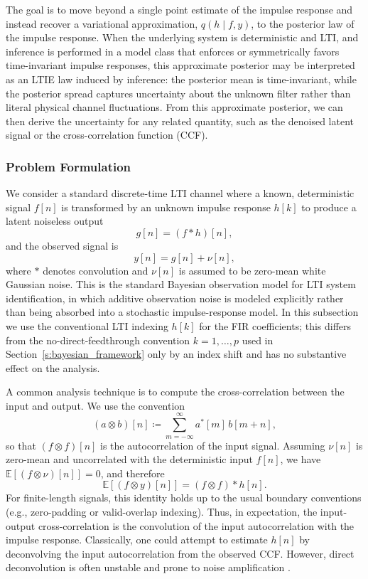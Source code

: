 \documentclass[preprint,1p,times,authoryear]{elsarticle}
\begin{document}
The goal is to move beyond a single point estimate of the impulse response and instead recover a variational approximation, $q(h \mid f, y)$, to the posterior law of the impulse response. When the underlying system is deterministic and LTI, and inference is performed in a model class that enforces or symmetrically favors time-invariant impulse responses, this approximate posterior may be interpreted as an LTIE law induced by inference: the posterior mean is time-invariant, while the posterior spread captures uncertainty about the unknown filter rather than literal physical channel fluctuations. From this approximate posterior, we can then derive the uncertainty for any related quantity, such as the denoised latent signal or the cross-correlation function (CCF).

\subsubsection{Problem Formulation}

We consider a standard discrete-time LTI channel where a known, deterministic signal $f[n]$ is transformed by an unknown impulse response $h[k]$ to produce a latent noiseless output
\begin{equation}
g[n] = (f * h)[n],
\end{equation}
and the observed signal is
\begin{equation}
y[n] = g[n] + \nu[n],
\end{equation}
where $*$ denotes convolution and $\nu[n]$ is assumed to be zero-mean white Gaussian noise. This is the standard Bayesian observation model for LTI system identification, in which additive observation noise is modeled explicitly rather than being absorbed into a stochastic impulse-response model. In this subsection we use the conventional LTI indexing $h[k]$ for the FIR coefficients; this differs from the no-direct-feedthrough convention $k=1,\ldots,p$ used in Section~\ref{s:bayesian_framework} only by an index shift and has no substantive effect on the analysis.

A common analysis technique is to compute the cross-correlation between the input and output. We use the convention
\[
(a \otimes b)[n] \coloneqq \sum_{m=-\infty}^{\infty} a^*[m]\, b[m+n],
\]
so that $(f \otimes f)[n]$ is the autocorrelation of the input signal. Assuming $\nu[n]$ is zero-mean and uncorrelated with the deterministic input $f[n]$, we have $\mathbb{E}[(f \otimes \nu)[n]] = 0$, and therefore
\begin{equation}
\mathbb{E}[ (f \otimes y)[n] ] = (f \otimes f) * h[n].
\end{equation}
For finite-length signals, this identity holds up to the usual boundary conventions (e.g., zero-padding or valid-overlap indexing). Thus, in expectation, the input-output cross-correlation is the convolution of the input autocorrelation with the impulse response. Classically, one could attempt to estimate $h[n]$ by deconvolving the input autocorrelation from the observed CCF. However, direct deconvolution is often unstable and prone to noise amplification \citep{BerteroBoccacci2005}.
\end{document}

